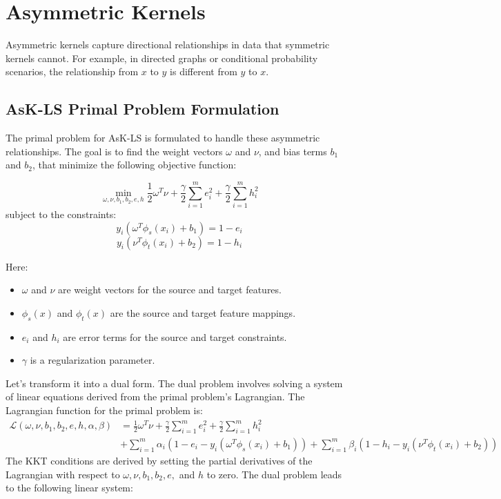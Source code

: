 \section{Asymmetric Kernels}
\label{sec:asymmetric_kernels}

Asymmetric kernels capture directional relationships in data that symmetric kernels cannot. For example, in directed graphs or conditional probability scenarios, the relationship from \(x\) to \(y\) is different from \(y\) to \(x\).

\subsection{AsK-LS Primal Problem Formulation}
The primal problem for AsK-LS is formulated to handle these asymmetric relationships. The goal is to find the weight vectors \( \omega \) and \( \nu \), and bias terms \( b_1 \) and \( b_2 \), that minimize the following objective function:

\[
\min_{\omega, \nu, b_1, b_2, e, h} \frac{1}{2} \omega^T \nu + \frac{\gamma}{2} \sum_{i=1}^m e_i^2 + \frac{\gamma}{2} \sum_{i=1}^m h_i^2
\]
subject to the constraints:
\[
y_i (\omega^T \phi_s(x_i) + b_1) = 1 - e_i
\]
\[
y_i (\nu^T \phi_t(x_i) + b_2) = 1 - h_i
\]

Here:
\begin{itemize}
	\item \( \omega \) and \( \nu \) are weight vectors for the source and target features.
	\item \( \phi_s(x) \) and \( \phi_t(x) \) are the source and target feature mappings.
	\item \( e_i \) and \( h_i \) are error terms for the source and target constraints.
	\item \( \gamma \) is a regularization parameter.
\end{itemize}

Let's transform it into a dual form. The dual problem involves solving a system of linear equations derived from the primal problem's Lagrangian. The Lagrangian function for the primal problem is:
\begin{align*}
	\mathcal{L}( \omega, \nu, b_1, b_2, e, h, \alpha, \beta) &= \frac{1}{2} \omega^T \nu + \frac{\gamma}{2} \sum_{i=1}^m e_i^2 + \frac{\gamma}{2} \sum_{i=1}^m h_i^2\\ 
		   &+ \sum_{i=1}^m \alpha_i (1 - e_i - y_i (\omega^T \phi_s(x_i) + b_1)) + \sum_{i=1}^m \beta_i (1 - h_i - y_i (\nu^T \phi_t(x_i) + b_2))
\end{align*}
The KKT conditions are derived by setting the partial derivatives of the Lagrangian with respect to \( \omega, \nu, b_1, b_2, e, \) and \( h \) to zero. The dual problem leads to the following linear system:

